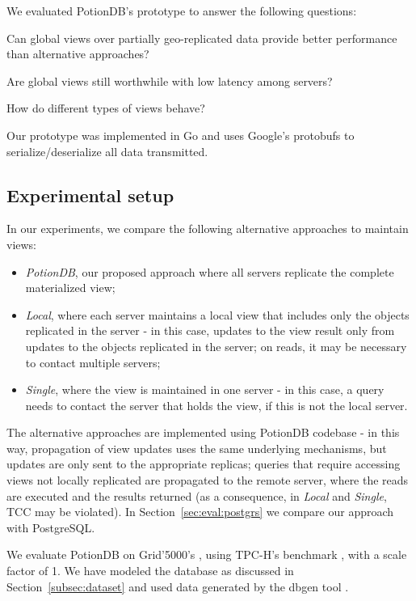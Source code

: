 \documentclass[sigplan,twocolumn,review,anonymous]{acmart}
\begin{document}
We evaluated PotionDB's prototype to answer the following questions: 
\begin{enumerate*}[label=(\roman*)]
	\item  \label{enum:q1} Can global views over partially geo-replicated data provide better performance than alternative approaches? 	     
	\item \label{enum:q2} Are global views still worthwhile with low latency among servers?
	\item \label{enum:q3} How do different types of views behave? 
\end{enumerate*}

Our prototype was implemented in Go and uses Google's protobufs to serialize/deserialize all data transmitted.

\subsection{Experimental setup}
\label{subsec:setup}

In our experiments, we compare the following alternative approaches to maintain views:
\begin{itemize}[leftmargin=*,noitemsep,topsep=0pt,parsep=0pt,partopsep=0pt]
	\item \emph{PotionDB}, our proposed approach where all servers replicate the complete materialized view;
	\item \emph{Local}, where each server maintains a local view that includes only the objects replicated in the server - in this case, 
	updates to the view result only from updates to the objects replicated in the server; 
	on reads, it may be necessary to contact multiple servers;
	\item \emph{Single}, where the view is maintained in one server - in this case, a query needs to 
	contact the server that holds the view, if this is not the local server. 
\end{itemize}
The alternative approaches are implemented using PotionDB codebase - in this way, propagation of view updates uses the same underlying mechanisms, but updates are only sent to the appropriate replicas; queries that require accessing views not locally replicated are propagated to the remote server, where the reads are executed and the results returned (as a consequence, in \textit{Local} and \textit{Single}, TCC may be violated).
In Section~\ref{sec:eval:postgrs} we compare our approach with PostgreSQL.

We evaluate PotionDB on Grid'5000's \cite{Grid5000}, using TPC-H's benchmark \cite{tpch}, with a scale factor of 1. %
We have modeled the database as discussed in Section~\ref{subsec:dataset} and used data generated by the dbgen tool \cite{tpch}.
\end{document}
